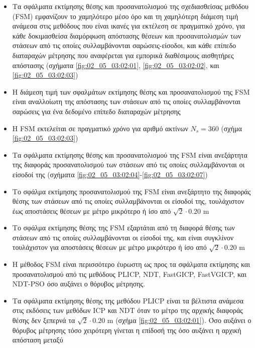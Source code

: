 \begin{itemize}
  \item Τα σφάλματα εκτίμησης θέσης και προσανατολισμού της σχεδιασθείσας
        μεθόδου (FSM) εμφανίζουν το χαμηλότερο μέσο όρο και τη χαμηλότερη
        διάμεση τιμή ανάμεσα στις μεθόδους που είναι ικανές για εκτέλεση σε
        πραγματικό χρόνο, για κάθε δοκιμασθείσα διαμόρφωση απόστασης θέσεων και
        προσανατολισμών των στάσεων από τις οποίες συλλαμβάνονται
        σαρώσεις-είσοδοι, και κάθε επίπεδο διαταραχών μέτρησης που αναφέρεται
        για εμπορικά διαθέσιμους αισθητήρες απόστασης (σχήματα
        \ref{fig:02_05_03:02:01}, \ref{fig:02_05_03:02:02}, και
        \ref{fig:02_05_03:02:03})
  \item Η διάμεση τιμή των σφαλμάτων εκτίμησης θέσης και προσανατολισμού
        της FSM είναι αναλλοίωτη της απόστασης των στάσεων από τις οποίες
        συλλαμβάνονται σαρώσεις για ένα δεδομένο επίπεδο διαταραχών μέτρησης
  \item Η FSM εκτελείται σε πραγματικό χρόνο για αριθμό ακτίνων $N_s = 360$
        (σχήμα \ref{fig:02_05_03:02:03})
  \item Τα σφάλματα εκτίμησης θέσης και προσανατολισμού της FSM είναι
        ανεξάρτητα της διαφοράς προσανατολισμού των στάσεων από τις οποίες
        συλλαμβάνονται οι είσοδοί της (σχήματα
        \ref{fig:02_05_03:02:04}-\ref{fig:02_05_03:02:07})
  \item Το σφάλμα εκτίμησης προσανατολισμού της FSM είναι ανεξάρτητο της
        διαφοράς θέσης των στάσεων από τις οποίες συλλαμβάνονται οι είσοδοί της,
        τουλάχιστον έως αποστάσεις θέσεων με μέτρο μικρότερο ή ίσο από
        $\sqrt{2}\cdot 0.20$ m
  \item Το σφάλμα εκτίμησης θέσης της FSM εξαρτάται από τη διαφορά θέσης των
        στάσεων από τις οποίες συλλαμβάνονται οι είσοδοί της, και είναι
        συγκλίνον τουλάχιστον για αποστάσεις θέσεων με μέτρο μικρότερο ή ίσο από
        $\sqrt{2}\cdot 0.20$ m
  \item Η μέθοδος FSM είναι περισσότερο έυρωστη ως προς τα σφάλματα εκτίμησης
        και προσανατολισμού από τις μεθόδους PLICP, NDT, FastGICP, FastVGICP,
        και NDT-PSO όσο αυξάνει ο θόρυβος μέτρησης.
  \item Τα σφάλματα εκτίμησης θέσης της μεθόδου PLICP είναι τα βέλτιστα ανάμεσα
        στις εκδόσεις των μεθόδων ICP και NDT όταν το μέτρο της αρχικής
        διαφοράς θέσης δεν ξεπερνά τα $\sqrt{2}\cdot 0.20$ m (σχήμα
        \ref{fig:02_05_03:02:01}). Όσο αυξάνει ο θόρυβος μέτρησης τόσο
        χειρότερη γίνεται η επίδοσή της όσο αυξάνει η αρχική απόσταση μεταξύ

\end{itemize}

